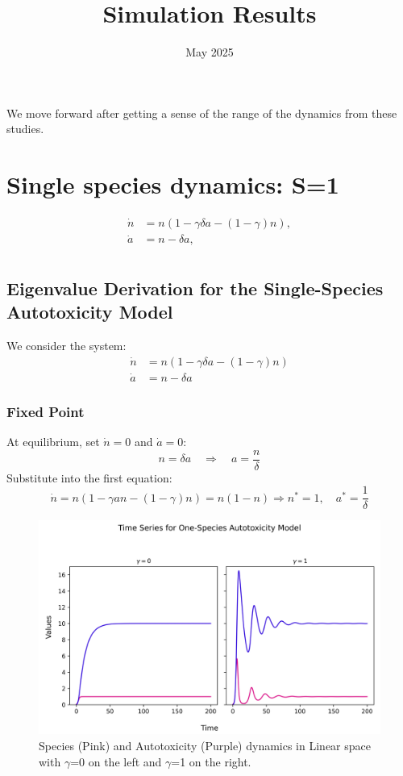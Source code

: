 \documentclass{article}
\begin{document}
We move forward after getting a sense of the range of the dynamics from these studies.



\title{Simulation Results}
\author{}
\date{May 2025}
\maketitle
\section{Single species dynamics: S=1}
\begin{align}
\dot{n} &= n\left( 1 - \gamma \delta a - (1 - \gamma)n \right),\\
\dot{a} &= n - \delta a,\\
\end{align}
\subsection*{Eigenvalue Derivation for the Single-Species Autotoxicity Model}

We consider the system:
\begin{align}
\dot{n} &= n\left( 1 - \gamma \delta a - (1 - \gamma)n \right) \\
\dot{a} &= n - \delta a
\end{align}

\subsubsection*{Fixed Point}

At equilibrium, set $\dot{n} = 0$ and $\dot{a} = 0$:
\[
n = \delta a \quad \Rightarrow \quad a = \frac{n}{\delta}
\]
Substitute into the first equation:
\[
\dot{n} = n \left( 1 - \gamma a n - (1 - \gamma) n \right) = n(1 - n)
\Rightarrow n^* = 1, \quad a^* = \frac{1}{\delta}
\]


\begin{figure}[H]
    \centering
    \includegraphics[width=\linewidth]{SingleSpecies/time_series_single_species.png}
    \caption{Species (Pink) and Autotoxicity (Purple) dynamics in Linear space with $\gamma$=0 on the left and $\gamma$=1 on the right.}
\end{figure}
\clearpage
\end{document}
